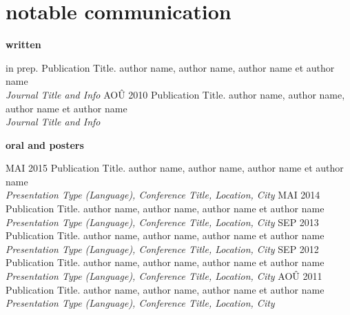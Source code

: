 \documentclass[print]{friggos-cv} %
\begin{document}


\section{notable communication}
\textbf{\large written}\vspace{10pt}\\
\begin{entrylist}
\entry
{in prep.}
{Publication Title.}
{}
{author name, author name, author name et author name\\\emph{Journal Title and Info}}
\entry
{AOÛ 2010}
{Publication Title.}
{}
{author name, author name, author name et author name\\\emph{Journal Title and Info}}
\end{entrylist}
\textbf{\large oral and posters}\vspace{10pt}\\
\begin{entrylist}
\entry
{MAI 2015}
{Publication Title.}
{}
{author name, author name, author name et author name\\\emph{Presentation Type (Language), Conference Title, Location, City}}
\entry
{MAI 2014}
{Publication Title.}
{}
{author name, author name, author name et author name\\\emph{Presentation Type (Language), Conference Title, Location, City}}
\entry
{SEP 2013}
{Publication Title.}
{}
{author name, author name, author name et author name\\\emph{Presentation Type (Language), Conference Title, Location, City}}
\entry
{SEP 2012}
{Publication Title.}
{}
{author name, author name, author name et author name\\\emph{Presentation Type (Language), Conference Title, Location, City}}
\entry
{AOÛ 2011}
{Publication Title.}
{}
{author name, author name, author name et author name\\\emph{Presentation Type (Language), Conference Title, Location, City}}
\end{entrylist}
\end{document}
